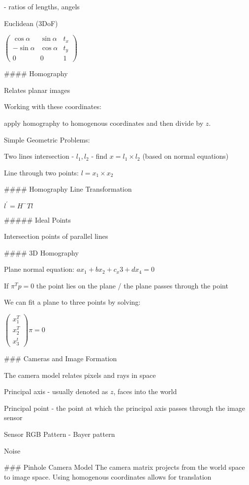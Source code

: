 - ratios of lengths, angels

Euclidean (3DoF)

$\left(  \begin{matrix} \cos  \alpha & \sin \alpha  & t_x \\  -\sin \alpha & \cos \alpha & t_y \\ 0 & 0 & 1  \end{matrix} \right)$

#### Homography

Relates planar images

Working with these coordinates:

apply homography to homogenous coordinates and then divide by $z$.

Simple Geometric Problems:

Two lines intersection - $l_1,l_2$ - find $x = l_1 \times l_2$  (based on normal equations)

Line through two points: $l = x_1 \times x_2 $

#### Homography Line Transformation

$l^\prime = H^-T l$

##### Ideal Points

Intersection points of parallel lines

#### 3D Homography

Plane normal equation: $ax_1 + bx_2 + c_x3 + d x_4 = 0$ 

If $\pi^T p = 0$ the point lies on the plane / the plane passes through the point

We can fit a plane to three points by solving: 

$\left( \begin{matrix} x_1^T \\ x_2^T \\ x_3^t \end{matrix} \right) \pi = 0 $



### Cameras and Image Formation

The camera model relates pixels and rays in space

Principal axis - usually denoted as $z$, faces into the world

Principal point - the point at which the principal axis passes through the image sensor

Sensor RGB Pattern - Bayer pattern

Noise

### Pinhole Camera Model
The camera matrix projects from the world space to image space. Using homogenous coordinates allows for translation

